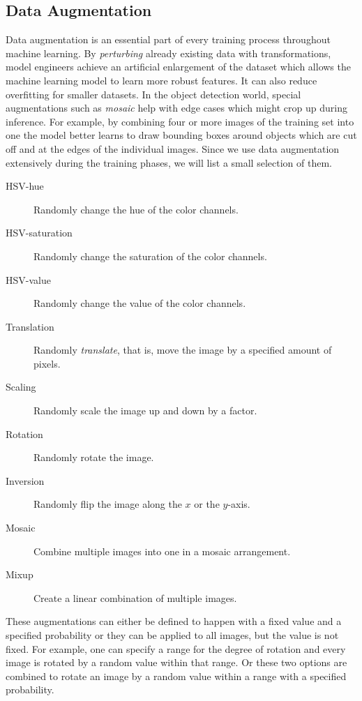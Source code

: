 \documentclass[final]{vutinfth} %
\begin{document}
\subsection{Data Augmentation}
\label{sec:methods-augmentation}

Data augmentation is an essential part of every training process
throughout machine learning. By \emph{perturbing} already existing
data with transformations, model engineers achieve an artificial
enlargement of the dataset which allows the machine learning model to
learn more robust features. It can also reduce overfitting for smaller
datasets. In the object detection world, special augmentations such
as \emph{mosaic} help with edge cases which might crop up during
inference. For example, by combining four or more images of the
training set into one the model better learns to draw bounding boxes
around objects which are cut off and at the edges of the individual
images. Since we use data augmentation extensively during the training
phases, we will list a small selection of them.

\begin{description}
\item[HSV-hue] Randomly change the hue of the color channels.
\item[HSV-saturation] Randomly change the saturation of the color
  channels.
\item[HSV-value] Randomly change the value of the color channels.
\item[Translation] Randomly \emph{translate}, that is, move the image
  by a specified amount of pixels.
\item[Scaling] Randomly scale the image up and down by a factor.
\item[Rotation] Randomly rotate the image.
\item[Inversion] Randomly flip the image along the $x$ or the
  $y$-axis.
\item[Mosaic] Combine multiple images into one in a mosaic
  arrangement.
\item[Mixup] Create a linear combination of multiple images.
\end{description}

These augmentations can either be defined to happen with a fixed value
and a specified probability or they can be applied to all images, but
the value is not fixed. For example, one can specify a range for the
degree of rotation and every image is rotated by a random value within
that range. Or these two options are combined to rotate an image by a
random value within a range with a specified probability.
\end{document}

